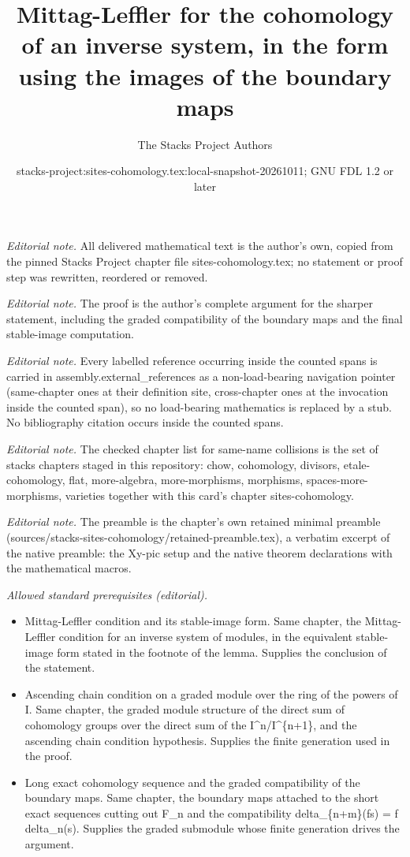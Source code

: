 \documentclass[10pt,a4paper]{amsart}
\title{Mittag-Leffler for the cohomology of an inverse system, in the form using the images of the boundary maps}
\author{The Stacks Project Authors}
\date{stacks-project:sites-cohomology.tex:local-snapshot-20261011; GNU FDL 1.2 or later}
\theoremstyle{plain}
\theoremstyle{definition}
\theoremstyle{remark}
\numberwithin{equation}{subsection}
\begin{document}
\maketitle
\noindent\textit{Editorial note.} All delivered mathematical text is the author's own, copied from the pinned Stacks Project chapter file sites-cohomology.tex; no statement or proof step was rewritten, reordered or removed.\par\medskip
\noindent\textit{Editorial note.} The proof is the author's complete argument for the sharper statement, including the graded compatibility of the boundary maps and the final stable-image computation.\par\medskip
\noindent\textit{Editorial note.} Every labelled reference occurring inside the counted spans is carried in assembly.external\_references as a non-load-bearing navigation pointer (same-chapter ones at their definition site, cross-chapter ones at the invocation inside the counted span), so no load-bearing mathematics is replaced by a stub. No bibliography citation occurs inside the counted spans.\par\medskip
\noindent\textit{Editorial note.} The checked chapter list for same-name collisions is the set of stacks chapters staged in this repository: chow, cohomology, divisors, etale-cohomology, flat, more-algebra, more-morphisms, morphisms, spaces-more-morphisms, varieties together with this card's chapter sites-cohomology.\par\medskip
\noindent\textit{Editorial note.} The preamble is the chapter's own retained minimal preamble (sources/stacks-sites-cohomology/retained-preamble.tex), a verbatim excerpt of the native preamble: the Xy-pic setup and the native theorem declarations with the mathematical macros.\par\medskip
\noindent\textit{Allowed standard prerequisites (editorial).}\begin{itemize}
\item Mittag-Leffler condition and its stable-image form. Same chapter, the Mittag-Leffler condition for an inverse system of modules, in the equivalent stable-image form stated in the footnote of the lemma. Supplies the conclusion of the statement.
\item Ascending chain condition on a graded module over the ring of the powers of I. Same chapter, the graded module structure of the direct sum of cohomology groups over the direct sum of the I\textasciicircum{}n/I\textasciicircum{}\{n+1\}, and the ascending chain condition hypothesis. Supplies the finite generation used in the proof.
\item Long exact cohomology sequence and the graded compatibility of the boundary maps. Same chapter, the boundary maps attached to the short exact sequences cutting out F\_n and the compatibility delta\_\{n+m\}(fs) = f delta\_n(s). Supplies the graded submodule whose finite generation drives the argument.
\end{itemize}\medskip
\end{document}
